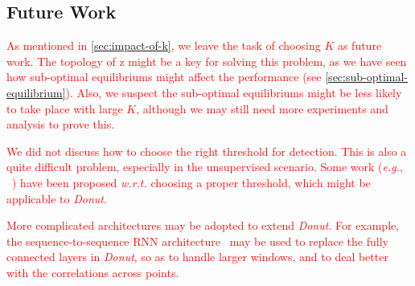 \documentclass[sigconf]{acmart}
\newcommand\compactdel[1]{{\textcolor{red}{#1}}}
\newcommand\compactdel[1]{}
\newcommand\compactdel[1]{#1}
\newcommand{\DONUT}{\textit{Donut}}
\newcommand{\EG}{\textit{e.g.}}
\newcommand{\WRT}{\textit{w.r.t.}}
\newcommand{\vv}[1]{\bm{\mathrm{{#1}}}}
\begin{document}

\subsection{Future Work}
\label{sec:limitation}
%

\compactdel{As mentioned in \cref{sec:impact-of-k}, we leave the task of choosing $K$ as future work.
The topology of $\vv{z}$ might be a key for solving this problem, as we have seen how sub-optimal equilibriums might affect the performance (see \cref{sec:sub-optimal-equilibrium}).
Also, we suspect the sub-optimal equilibriums might be less likely to take place with large $K$, although we may still need more experiments and analysis to prove this.}

\compactdel{We did not discuss how to choose the right threshold for detection.
This is also a quite difficult problem, especially in the unsupervised scenario.
Some work (\EG, ~\cite{egads}) have been proposed \WRT{} choosing a proper threshold, which might be applicable to \DONUT{}.}

\compactdel{More complicated architectures may be adopted to extend \DONUT{}.
For example, the sequence-to-sequence RNN architecture~\cite{RNN} may be used to replace the fully connected layers in \DONUT{}, so as to handle larger windows, and to deal better with the correlations across points.}





  \fi
\fi
\end{document}
